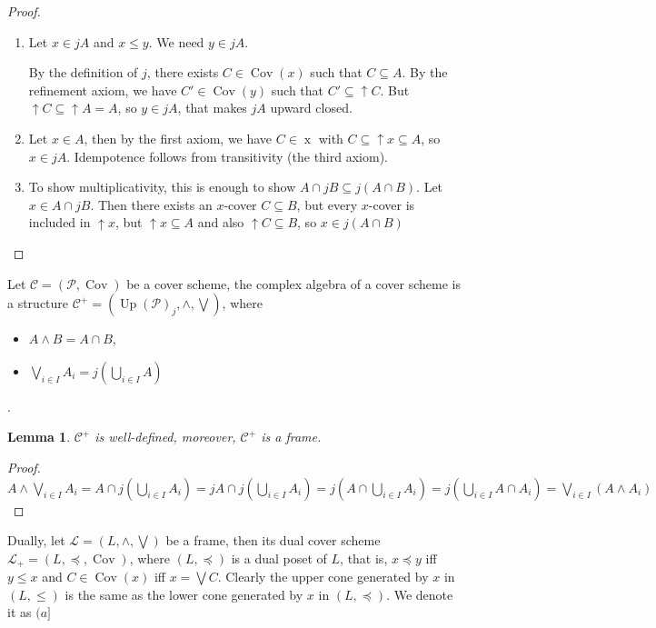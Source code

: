 \documentclass[a4paper]{article}
\theoremstyle{defin}
\theoremstyle{theorem}
\theoremstyle{claim}
\theoremstyle{prop}
\theoremstyle{lemma}
\newtheorem{lemma}{Lemma}
\theoremstyle{fact}
\theoremstyle{ex}
\theoremstyle{col}
\begin{document}
\begin{proof}
$ $
\begin{enumerate}
\item Let $x \in j A$ and $x \leq y$. We need $y \in j A$.

By the definition of $j$, there exists $C \in \operatorname{Cov}(x)$ such that $C \subseteq A$.
By the refinement axiom, we have $C' \in \operatorname{Cov}(y)$ such that $C' \subseteq \uparrow C$.
But $\uparrow C \subseteq \uparrow A = A$, so $y \in j A$, that makes $j A$ upward closed.
\item Let $x \in A$, then by the first axiom, we have $C \in \operatorname{x}$ with $C \subseteq \uparrow x \subseteq A$, so $x \in j A$. Idempotence follows from transitivity (the third axiom).

\item To show multiplicativity, this is enough to show $A \cap j B \subseteq j (A \cap B)$.
Let $x \in A \cap j B$. Then there exists an $x$-cover $C \subseteq B$, but every $x$-cover is included in $\uparrow x$, but $\uparrow x \subseteq A$ and also $\uparrow C \subseteq B$, so $x \in j (A \cap B)$
\end{enumerate}
\end{proof}

Let $\mathcal{C} = (\mathcal{P}, \operatorname{Cov})$ be a cover scheme, the complex algebra of a cover scheme is a structure $\mathcal{C}^{+} = (\operatorname{Up}(\mathcal{P})_j, \wedge, \bigvee)$, where
\begin{itemize}
\item $A \wedge B = A \cap B$,
\item $\bigvee \limits_{i \in I} A_i = j(\bigcup \limits_{i \in I} A)$
\end{itemize}.

\begin{lemma}
$\mathcal{C}^{+}$ is well-defined, moreover, $\mathcal{C}^{+}$ is a frame.
\end{lemma}

\begin{proof}
$A \wedge \bigvee \limits_{i \in I} A_i = A \cap j (\bigcup \limits_{i \in I} A_i) = j A \cap j (\bigcup \limits_{i \in I} A_i) = j (A \cap \bigcup \limits_{i \in I} A_i) = j (\bigcup \limits_{i \in I} A \cap A_i) = \bigvee \limits_{i \in I} (A \wedge A_i)$
\end{proof}

Dually, let $\mathcal{L} = (L, \wedge, \bigvee)$ be a frame, then its dual cover scheme $\mathcal{L}_+ = (L, \preceq, \operatorname{Cov})$, where $(L, \preceq)$ is a dual poset of $L$, that is, $x \preceq y$ iff $y \leq x$ and $C \in \operatorname{Cov}(x)$ iff $x = \bigvee C$. Clearly the upper cone generated by $x$ in $(L, \leq)$ is the same as the lower cone generated by $x$ in $(L, \preceq)$. We denote it as $(a]$
\end{document}
